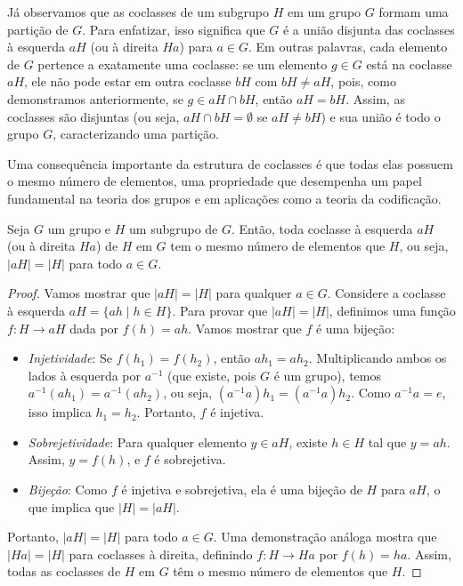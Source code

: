 \begin{remark}
Já observamos que as coclasses de um subgrupo $H$ em um grupo $G$
formam uma partição de $G$. Para enfatizar, isso significa que $G$ é
a união disjunta das coclasses à esquerda $aH$ (ou à direita $Ha$)
para $a \in G$. Em outras palavras, cada elemento de $G$ pertence a
exatamente uma coclasse: se um elemento $g \in G$ está na coclasse $aH$,
ele não pode estar em outra coclasse $bH$ com $bH \neq aH$, pois,
como demonstramos anteriormente, se $g \in aH \cap bH$, então $aH = bH$.
Assim, as coclasses são disjuntas (ou seja, $aH \cap bH = \emptyset$
se $aH \neq bH$) e sua união é todo o grupo $G$, caracterizando uma
partição.
\end{remark}


Uma consequência importante da estrutura de coclasses é que todas elas possuem
o mesmo número de elementos, uma propriedade que desempenha um papel
fundamental na teoria dos grupos e em aplicações como a teoria da codificação.

\begin{theorem}
Seja $G$ um grupo e $H$ um subgrupo de $G$. Então, toda coclasse à esquerda
$aH$ (ou à direita $Ha$) de $H$ em $G$ tem o mesmo número de elementos que
$H$, ou seja, $|aH| = |H|$ para todo $a \in G$.
\end{theorem}

\begin{proof}
Vamos mostrar que $|aH| = |H|$ para qualquer $a \in G$. Considere a coclasse à
esquerda $aH = \{ ah \mid h \in H \}$. Para provar que $|aH| = |H|$,
definimos uma função $f: H \to aH$ dada por $f(h) = ah$. Vamos mostrar que
$f$ é uma bijeção:
\begin{itemize}
\item \emph{Injetividade}: Se $f(h_1) = f(h_2)$, então $ah_1 = ah_2$.
    Multiplicando ambos os lados à
    esquerda por $a^{-1}$ (que existe, pois $G$ é um grupo), temos
    $a^{-1}(ah_1) = a^{-1}(ah_2)$, ou seja, $(a^{-1}a)h_1 = (a^{-1}a)h_2$. Como
    $a^{-1}a = e$, isso implica $h_1 = h_2$. Portanto, $f$ é injetiva.
    \item \emph{Sobrejetividade}: Para qualquer elemento $y \in aH$, existe $h
      \in H$ tal que $y = ah$. Assim, $y = f(h)$, e $f$ é sobrejetiva.
    \item \emph{Bijeção}: Como $f$ é injetiva e sobrejetiva, ela é uma bijeção
      de $H$ para $aH$, o que implica que $|H| = |aH|$.
\end{itemize}
Portanto, $|aH| = |H|$ para todo $a \in G$. Uma demonstração análoga mostra que
$|Ha| = |H|$ para coclasses à direita, definindo $f: H \to Ha$ por $f(h) = ha$.
Assim, todas as coclasses de $H$ em $G$ têm o mesmo número de elementos que $H$.
\end{proof}

